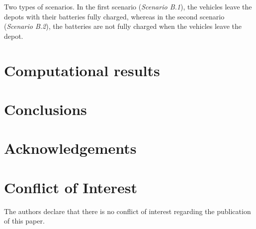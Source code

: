 \documentclass[11pt]{article}
\begin{document}
Two types of scenarios. In the first scenario (\textit{Scenario B.1}), the vehicles leave the depots with their batteries fully charged, whereas in the second scenario (\textit{Scenario B.2}), the batteries are not fully charged when the vehicles leave the depot. 


\section{Computational results}
\label{section:results}


\section{Conclusions}
\label{section:conclusion}

\section*{Acknowledgements}
\label{section:Acknowledgements}


\section*{Conflict of Interest}
\label{section:Conflict}

The authors declare that there is no conflict of interest regarding the publication of this paper.






\end{document}
